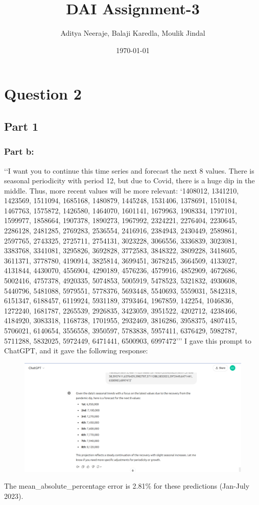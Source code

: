 \documentclass{article}
\title{DAI Assignment-3}
\author{Aditya Neeraje,  Balaji Karedla,  Moulik Jindal}
\date{\today}
\begin{document}
\maketitle
\tableofcontents


\newpage

\section{Question 2}
\subsection{Part 1}
\subsubsection{Part b: }
\lq\lq I want you to continue this time series and forecast the next 8 values. There is seasonal periodicity with period 12,  but due to Covid,  there is a huge dip in the middle. Thus,  more recent values will be more relevant: \lq1408012, 1341210, 1423569, 1511094, 1685168, 1480879, 1445248, 1531406, 1378691, 1510184, 1467763, 1575872, 1426580, 1464070, 1601141, 1679963, 1908334, 1797101, 1599977, 1858664, 1907378, 1890273, 1967992, 2324221, 2276404, 2230645, 2286128, 2481285, 2769283, 2536554, 2416916, 2384943, 2430449, 2589861, 2597765, 2743325, 2725711, 2754131, 3023228, 3066556, 3336839, 3023081, 3383768, 3341081, 3295826, 3692828, 3772583, 3848322, 3809228, 3418605, 3611371, 3778780, 4190914, 3825814, 3699451, 3678245, 3664509, 4133027, 4131844, 4430070, 4556904, 4290189, 4576236, 4579916, 4852909, 4672686, 5002416, 4757378, 4920335, 5074853, 5005919, 5478523, 5321832, 4930608, 5440796, 5481088, 5979551, 5778376, 5693448, 5540693, 5559031, 5842318, 6151347, 6188457, 6119924, 5931189, 3793464, 1967859, 142254, 1046836, 1272240, 1681787, 2265539, 2926835, 3423059, 3951522, 4202712, 4238466, 4184920, 3083318, 1168738, 1701955, 2932469, 3816286, 3958375, 4807415, 5706021, 6140654, 3556558, 3950597, 5783838, 5957411, 6376429, 5982787, 5711288, 5832025, 5972449, 6471441, 6500903, 6997472\rq\rq\rq
I gave this prompt to ChatGPT,  and it gave the following response:\\
\begin{figure}[H]
\centering
\includegraphics[width=\textwidth]{ChatGPT Response.png}
\end{figure}
The mean\_absolute\_percentage error is 2.81\% for these predictions (Jan-July 2023).
\end{document}
